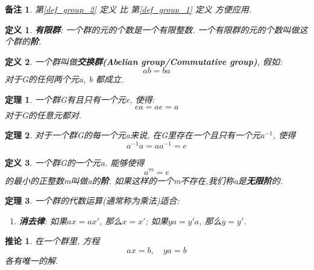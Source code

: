 \documentclass[utf8]{ctexbook}
\newtheorem{theorem}{定理}[section]
\newtheorem{definition}{定义}[section]
\newtheorem{memo}{备注}[section]
\newtheorem{corollary}{推论}[section]
\begin{document}
\begin{memo}
第\ref{def_group_2} 定义 比 第\ref{def_group_1} 定义 方便应用.
\end{memo}

\begin{definition}
\textbf{有限群}: 一个群的元的个数是一个有限整数. 一个有限群的元的个数叫做这个群的\textbf{阶}.
\end{definition}

\begin{definition}
一个群叫做\textbf{交换群(Abelian group/Commutative group)}, 假如:
\begin{equation}
ab= ba
\end{equation}
对于G的任何两个元a, b 都成立.
\end{definition}

\begin{theorem}
一个群G有且只有一个元e, 使得:
\begin{equation}
ea = ae = a
\end{equation}
对于G的任意元都对.
\end{theorem}

\begin{theorem}
对于一个群G的每一个元a来说, 在G里存在一个且只有一个元$a^{-1}$, 使得
\begin{equation}
a^{-1} a = a a^{-1} = e
\end{equation}
\end{theorem}

\begin{definition}
一个群G的一个元a. 能够使得
\begin{equation}
a^m = e
\end{equation}
的最小的正整数m叫做a的\textbf{阶}. 如果这样的一个m不存在,我们称a是\textbf{无限阶}的.
\end{definition}

\begin{theorem}
一个群的代数运算(通常称为乘法)适合:
\begin{enumerate}
\item[III']{\textbf{消去律}: 如果$ax = a x'$, 那么$x = x'$; 如果$ya = y' a $, 那么$y = y'$.}
\end{enumerate}
\end{theorem}

\begin{corollary}
在一个群里, 方程
\begin{equation}
ax = b, \quad y a = b
\end{equation}
各有唯一的解.
\end{corollary}
\end{document}
